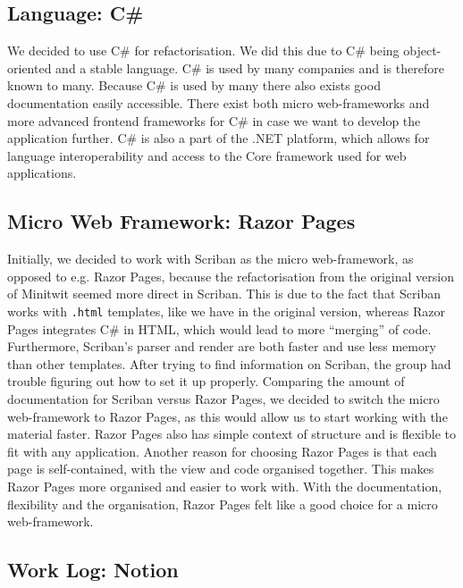 \subsection{Language: C\#}

We decided to use C\# for refactorisation. We did this due to C\# being object-oriented and a stable language. C\# is used by many companies and is therefore known to many. Because C\# is used by many there also exists good documentation easily accessible.
There exist both micro web-frameworks and more advanced frontend frameworks for C\# in case we want to develop the application further.
C\# is also a part of the .NET platform, which allows for language interoperability and access to the Core framework used for web applications.

\subsection{Micro Web Framework: Razor Pages}

Initially, we decided to work with Scriban as the micro web-framework, as opposed to e.g. Razor Pages, because the refactorisation from the original version of Minitwit seemed more direct in Scriban. This is due to the fact that Scriban works with \texttt{.html} templates, like we have in the original version, whereas Razor Pages integrates C\# in HTML, which would lead to more “merging” of code.
Furthermore, Scriban's parser and render are both faster and use less memory than other templates.
After trying to find information on Scriban, the group had trouble figuring out how to set it up properly. Comparing the amount of documentation for Scriban versus Razor Pages, we decided to switch the micro web-framework to Razor Pages, as this would allow us to start working with the material faster.
Razor Pages also has simple context of structure and is flexible to fit with any application. Another reason for choosing Razor Pages is that each page is self-contained, with the view and code organised together. This makes Razor Pages more organised and easier to work with. With the documentation, flexibility and the organisation, Razor Pages felt like a good choice for a micro web-framework.

\subsection{Work Log: Notion}

